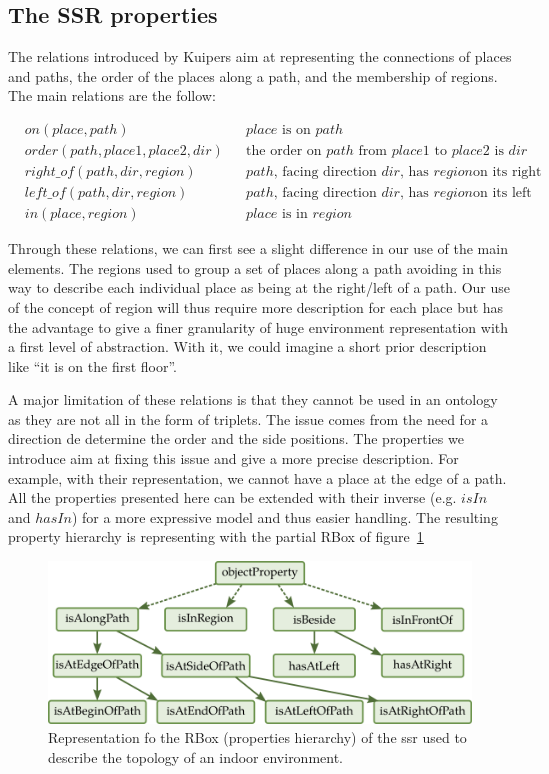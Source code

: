 \subsection{The SSR properties}

The relations introduced by Kuipers aim at representing the connections of places and paths, the order of the places along a path, and the membership of regions. The main relations are the follow:

\begin{align*}
&on(place,path) && place \text{ is on } path \\
&order(path,place1,place2,dir) && \text{the order on } path \text{ from } place1 \text{ to } place2 \text{ is } dir \\
&right\_of(path,dir,region) && path \text{, facing direction } dir \text{, has } region \text{on its right}\\
&left\_of(path,dir,region) && path \text{, facing direction } dir \text{, has } region \text{on its left} \\
&in(place,region) && place \text{ is in } region
\end{align*}

Through these relations, we can first see a slight difference in our use of the main elements. The regions used to group a set of places along a path avoiding in this way to describe each individual place as being at the right/left of a path. Our use of the concept of region will thus require more description for each place but has the advantage to give a finer granularity of huge environment representation with a first level of abstraction. With it, we could imagine a short prior description like ``it is on the first floor''.

A major limitation of these relations is that they cannot be used in an ontology as they are not all in the form of triplets. The issue comes from the need for a direction de determine the order and the side positions. The properties we introduce aim at fixing this issue and give a more precise description. For example, with their representation, we cannot have a place at the edge of a path. All the properties presented here can be extended with their inverse (e.g. $isIn$ and $hasIn$) for a more expressive model and thus easier handling. The resulting property hierarchy is representing with the partial RBox of figure~\ref{fig:chap3_rbox} 

\begin{figure}[ht!]
\centering
\includegraphics[scale=0.42]{figures/chapter3/ssr_rbox.png}
\caption{\label{fig:chap3_rbox} Representation fo the RBox (properties hierarchy) of the \acrlong{ssr} used to describe the topology of an indoor environment.}
\end{figure}

